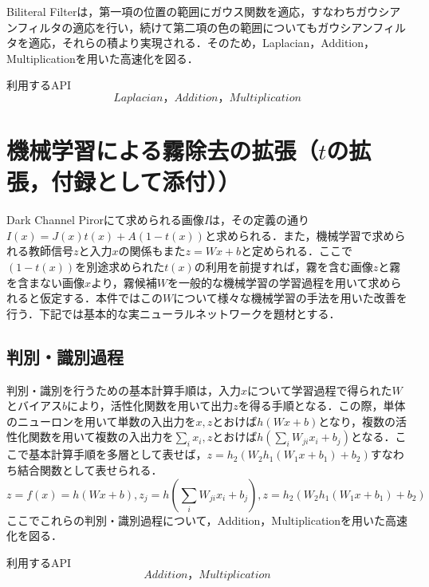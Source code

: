 \documentclass{jsarticle}
\begin{document}
Biliteral Filterは，第一項の位置の範囲にガウス関数を適応，すなわちガウシアンフィルタの適応を行い，続けて第二項の色の範囲についてもガウシアンフィルタを適応，それらの積より実現される．そのため，Laplacian，Addition，Multiplicationを用いた高速化を図る．

\begin{itembox}[l]{利用するAPI}
\[
Laplacian，Addition，Multiplication
\]
\end{itembox}


\section{機械学習による霧除去の拡張（$t$の拡張，付録として添付））}
\label{機械学習による霧除去の拡張（$t$の拡張，付録として添付）}

Dark Channel Pirorにて求められる画像$I$は，その定義の通り$I(x)=J(x)t(x)+A(1-t(x))$と求められる．また，機械学習で求められる教師信号$z$と入力$x$の関係もまた$z=Wx+b$と定められる．ここで$(1-t(x))$を別途求められた$t(x)$の利用を前提すれば，霧を含む画像$z$と霧を含まない画像$x$より，霧候補$W$を一般的な機械学習の学習過程を用いて求められると仮定する．本件ではこの$W$について様々な機械学習の手法を用いた改善を行う．下記では基本的な実ニューラルネットワーク\cite{4}を題材とする．

\subsection{判別・識別過程}
\label{判別・識別過程}

判別・識別を行うための基本計算手順は，入力$x$について学習過程で得られた$W$とバイアス$b$により，活性化関数を用いて出力$z$を得る手順となる．この際，単体のニューロンを用いて単数の入出力を$x,z$とおけば$h(Wx+b)$となり，複数の活性化関数を用いて複数の入出力を$\sum_{i} x_i,z$とおけば$h(\sum_{i} W_{ji} x_{i} + b_{j})$となる．ここで基本計算手順を多層として表せば，$z=h_2(W_2 h_1(W_1x+b_1) + b_2)$すなわち結合関数として表せられる．
\[
z=f(x)=h(W x + b),
z_j=h(\sum_{i} W_{ji} x_{i} + b_{j}),
z=h_2(W_2 h_1(W_1x+b_1) + b_2)
\]
ここでこれらの判別・識別過程について，Addition，Multiplicationを用いた高速化を図る．

\begin{itembox}[l]{利用するAPI}
\[
Addition，Multiplication
\]
\end{itembox}
\end{document}
